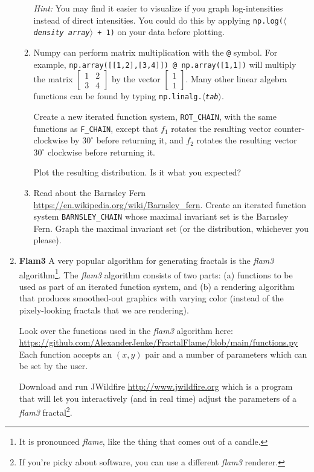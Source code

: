 \documentclass[letter]{article}
\newcommand{\mat}[1]{\begin{bmatrix}#1\end{bmatrix}}
\newcommand{\var}[1]{{$\langle$\it #1$\rangle$}}
\begin{document}
\begin{enumerate}
\begin{enumerate}
				\emph{Hint:} You may find it easier to visualize if you graph log-intensities instead of 
				direct intensities. You could do this by applying {\tt np.log(\var{density array} + 1)}
				on your data before plotting.

			\item Numpy can perform matrix multiplication with the {\tt @} symbol. For example,
				{\tt np.array([[1,2],[3,4]]) @ np.array([1,1])} will multiply the matrix
				$\mat{1&2\\3&4}$ by the vector $\mat{1\\1}$. Many other linear algebra functions
				can be found by typing {\tt np.linalg.\var{tab}}.

				Create a new iterated function system, \verb|ROT_CHAIN|, with the same functions as \verb|F_CHAIN|,
				except that $f_1$ rotates the resulting vector counter-clockwise by $30^\circ$ before returning it,
				and $f_2$ rotates the resulting vector $30^\circ$ clockwise before returning it.

				Plot the resulting distribution. Is it what you expected?

			\item Read about the Barnsley Fern \url{https://en.wikipedia.org/wiki/Barnsley_fern}. Create
				an iterated function system \verb|BARNSLEY_CHAIN| whose maximal invariant set is the Barnsley
				Fern. Graph the maximal invariant set (or the distribution, whichever you please).
				

				
		\end{enumerate}

	\item {\bfseries Flam3} A very popular algorithm for generating fractals is the \emph{flam3} algorithm\footnote{ It is pronounced
		\emph{flame}, like the thing that comes out of a candle.}. The \emph{flam3} algorithm consists of two parts:
		(a) functions to be used as part of an iterated function system, and (b) a rendering algorithm that produces
		smoothed-out graphics with varying color (instead of the pixely-looking fractals that we are rendering).

		Look over the functions used in the \emph{flam3} algorithm here: \url{https://github.com/AlexanderJenke/FractalFlame/blob/main/functions.py}
		Each function accepts an $(x,y)$ pair and a number of parameters which can be set by the user.

		Download and run JWildfire \url{http://www.jwildfire.org} which is a program that will let you interactively
		(and in real time) adjust the parameters of a \emph{flam3} fractal\footnote{ If you're picky about software, you can
		use a different \emph{flam3} renderer.}.


\end{enumerate}
\end{document}
